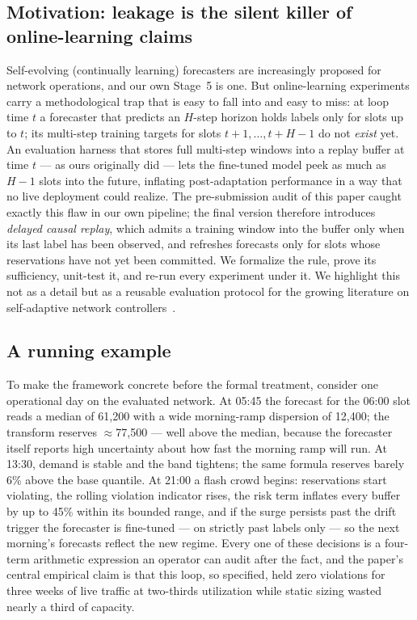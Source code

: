 \subsection{Motivation: leakage is the silent killer of online-learning claims}

Self-evolving (continually learning) forecasters are increasingly
proposed for network operations, and our own Stage~5 is one. But
online-learning experiments carry a methodological trap that is easy
to fall into and easy to miss: at loop time $t$ a forecaster that
predicts an $H$-step horizon holds labels only for slots up to $t$;
its multi-step training targets for slots $t+1,\dots,t+H-1$ do not
\emph{exist} yet. An evaluation harness that stores full multi-step
windows into a replay buffer at time $t$ --- as ours originally did
--- lets the fine-tuned model peek as much as $H-1$ slots into the
future, inflating post-adaptation performance in a way that no live
deployment could realize. The pre-submission audit of this paper
caught exactly this flaw in our own pipeline; the final version
therefore introduces \emph{delayed causal replay}, which admits a
training window into the buffer only when its last label has been
observed, and refreshes forecasts only for slots whose reservations
have not yet been committed. We formalize the rule, prove its
sufficiency, unit-test it, and re-run every experiment under it. We
highlight this not as a detail but as a reusable evaluation protocol
for the growing literature on self-adaptive network
controllers~\cite{kapoor2023leakage}.

\subsection{A running example}

To make the framework concrete before the formal treatment, consider
one operational day on the evaluated network. At 05:45 the forecast
for the 06:00 slot reads a median of 61{,}200 with a wide
morning-ramp dispersion of 12{,}400; the transform reserves
$\approx$77{,}500 --- well above the median, because the forecaster
itself reports high uncertainty about how fast the morning ramp will
run. At 13:30, demand is stable and the band tightens; the same
formula reserves barely 6\% above the base quantile. At 21:00 a
flash crowd begins: reservations start violating, the rolling
violation indicator rises, the risk term inflates every buffer by up
to 45\% within its bounded range, and if the surge persists past the
drift trigger the forecaster is fine-tuned --- on strictly past
labels only --- so the next morning's forecasts reflect the new
regime. Every one of these decisions is a four-term arithmetic
expression an operator can audit after the fact, and the paper's
central empirical claim is that this loop, so specified, held zero
violations for three weeks of live traffic at two-thirds utilization
while static sizing wasted nearly a third of capacity.


